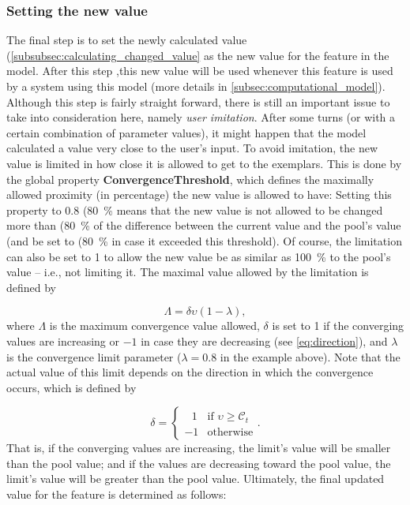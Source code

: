 
\subsubsection{Setting the new value}
\label{subsubsec:setting_the_new_value}

The final step is to set the newly calculated value (\cref{subsubsec:calculating_changed_value} as the new value for the feature in the model.
After this step ,this new value will be used whenever this feature is used by a system using this model (more details in \cref{subsec:computational_model}).
Although this step is fairly straight forward, there is still an important issue to take into consideration here, namely \textit{user imitation}.
After some turns (or with a certain combination of parameter values), it might happen that the model calculated a value very close to the user's input.
To avoid imitation, the new value is limited in how close it is allowed to get to the exemplars.
This is done by the global property \textbf{ConvergenceThreshold}, which defines the maximally allowed proximity (in percentage) the new value is allowed to have:
Setting this property to 0.8 (\SI{80}{\percent} means that the new value is not allowed to be changed more than (\SI{80}{\percent} of the difference between the current value and the pool's value (and be set to (\SI{80}{\percent} in case it exceeded this threshold).
Of course, the limitation can also be set to 1 to allow the new value be as similar as \SI{100}{\percent} to the pool's value -- i.e., not limiting it.
The maximal value allowed by the limitation is defined by

\begin{equation}
\label{eq:conv_limit}
\Lambda = \delta \upsilon \left(1 - \lambda \right),
\end{equation}
\noindent
where $\Lambda$ is the maximum convergence value allowed, $\delta$ is set to 1 if the converging values are increasing or $-1$ in case they are decreasing (see \cref{eq:direction}), and $\lambda$ is the convergence limit parameter ($\lambda=0.8$ in the example above).
\noindent
Note that the actual value of this limit depends on the direction in which the convergence occurs, which is defined by

\begin{equation}
\label{eq:direction}
\delta = 		
\begin{cases}
\ \ \ 1 & \text{if } \upsilon \geq \mathcal{C}_t\\
-1 & \text{otherwise}
\end{cases}.
\end{equation}
\noindent
That is, if the converging values are increasing, the limit's value will be smaller than the pool value;
and if the values are decreasing toward the pool value, the limit's value will be greater than the pool value.
Ultimately, the final updated value for the feature is determined as follows:


